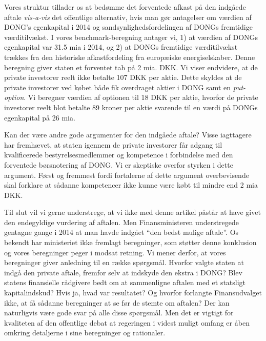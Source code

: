 \documentclass{article}
\begin{document}
Vores struktur tillader os at bedømme det forventede afkast på den indgåede aftale \emph{vis-a-vis} det offentlige alternativ, hvis man gør antagelser om værdien af DONG's egenkapital i 2014 og sandsynlighedsfordelingen af DONGs fremtidige værditilvækst. I vores benchmark-beregning antager vi, 1) at værdien af DONGs egenkapital var 31.5 mia i 2014, og 2) at DONGs fremtidige værditilvækst trækkes fra den historiske afkastfordeling fra europæiske energiselskaber. Denne beregning giver staten et forventet tab på 2 mia. DKK. Vi viser endvidere, at de private investorer reelt ikke betalte 107 DKK per aktie. Dette skyldes at de private investorer ved købet både fik overdraget  aktier i DONG samt en \emph{put-option}. Vi beregner værdien af optionen til 18 DKK per aktie, hvorfor de private investorer reelt blot betalte 89 kroner per aktie svarende til en værdi på DONGs egenkapital på 26 mia. %


Kan der være andre gode argumenter for den indgåede aftale? Visse iagttagere har fremhævet, at staten igennem de private investorer får adgang til kvalificerede bestyrelsesmedlemmer og kompetence i forbindelse med den forventede børsnotering af DONG. Vi er skeptiske overfor styrken i dette argument. Først og fremmest fordi fortalerne af dette argument overbevisende skal forklare at sådanne kompetencer ikke kunne være købt til mindre end 2 mia DKK.

Til slut vil vi gerne understrege, at vi ikke med denne artikel påstår at have givet den endegyldige vurdering af aftalen. Men Finansministeren understregede gentagne gange i 2014 at man havde indgået \enquote{den bedst mulige aftale}. 
Os bekendt har ministeriet ikke fremlagt beregninger, som støtter denne konklusion og vores beregninger peger i modsat retning. Vi mener derfor, at vores beregninger giver anledning til en række spørgsmål. Hvorfor valgte staten at indgå den private aftale, fremfor selv at indskyde den ekstra i DONG? Blev statens finansielle rådgivere bedt om at sammenligne aftalen med et statsligt kapitalindskud? Hvis ja, hvad var resultatet? Og hvorfor forlangte Finansudvalget ikke, at få  sådanne beregninger at se før de stemte om aftalen? Der kan naturligvis være gode svar på alle disse spørgsmål. Men det er vigtigt for kvaliteten af den offentlige debat at regeringen i videst muligt omfang er åben omkring detaljerne i sine beregninger og rationaler.
\end{document}
